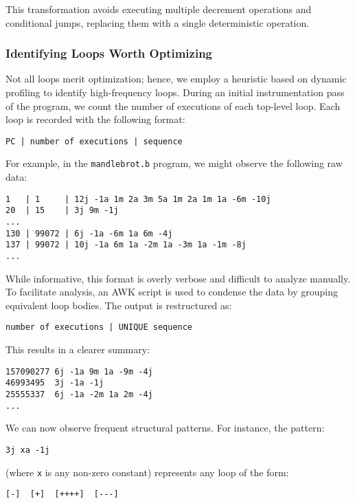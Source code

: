 This transformation avoids executing multiple decrement operations and conditional jumps, replacing them with a single deterministic operation.

\subsubsection*{Identifying Loops Worth Optimizing}

Not all loops merit optimization; hence, we employ a heuristic based on dynamic profiling to identify high-frequency loops. During an initial instrumentation pass of the program, we count the number of executions of each top-level loop. Each loop is recorded with the following format:

\begin{verbatim}
PC | number of executions | sequence
\end{verbatim}

For example, in the \texttt{mandlebrot.b} program, we might observe the following raw data:

\begin{verbatim}
1   | 1     | 12j -1a 1m 2a 3m 5a 1m 2a 1m 1a -6m -10j
20  | 15    | 3j 9m -1j
...
130 | 99072 | 6j -1a -6m 1a 6m -4j
137 | 99072 | 10j -1a 6m 1a -2m 1a -3m 1a -1m -8j
...
\end{verbatim}

While informative, this format is overly verbose and difficult to analyze manually. To facilitate analysis, an AWK script is used to condense the data by grouping equivalent loop bodies. The output is restructured as:

\begin{verbatim}
number of executions | UNIQUE sequence
\end{verbatim}

This results in a clearer summary:

\begin{verbatim}
157090277 6j -1a 9m 1a -9m -4j
46993495  3j -1a -1j
25555337  6j -1a -2m 1a 2m -4j
...
\end{verbatim}

We can now observe frequent structural patterns. For instance, the pattern:

\begin{verbatim}
3j xa -1j
\end{verbatim}

(where \texttt{x} is any non-zero constant) represents any loop of the form:

\begin{verbatim}
[-]  [+]  [++++]  [---]
\end{verbatim}

